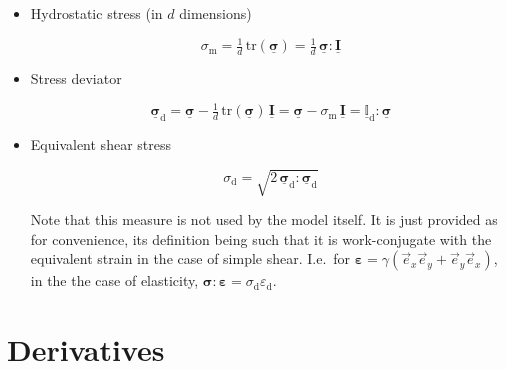 \documentclass[fleqn, colorlinks]{goose-article}
\newcommand\T[1]{\underline{\bm{{#1}}}}
\newcommand\TT[1]{\underline{\mathbb{{#1}}}}
\begin{document}
\begin{itemize}

    \item Hydrostatic stress (in $d$ dimensions)

    \begin{equation}
        \sigma_\mathrm{m}
        = \tfrac{1}{d} \, \mathrm{tr} ( \T{\sigma} )
        = \tfrac{1}{d} \, \T{\sigma} : \T{I}
    \end{equation}

    \item Stress deviator

    \begin{equation}
        \T{\sigma}_\mathrm{d}
        = \T{\sigma} - \tfrac{1}{d} \, \mathrm{tr} ( \T{\sigma} ) \, \T{I}
        = \T{\sigma} - \sigma_\mathrm{m} \, \T{I}
        = \TT{I}_\mathrm{d} : \T{\sigma}
    \end{equation}

    \item Equivalent shear stress

    \begin{equation}
        \sigma_\mathrm{d} = \sqrt{ 2 \, \T{\sigma}_\mathrm{d} : \T{\sigma}_\mathrm{d} }
    \end{equation}

    Note that this measure is not used by the model itself.
    It is just provided as for convenience, its definition being such that it is work-conjugate
    with the equivalent strain in the case of simple shear.
    I.e.\ for $\bm{\varepsilon} = \gamma (\vec{e}_x \vec{e}_y + \vec{e}_y \vec{e}_x)$,
    in the the case of elasticity,
    $\bm{\sigma} : \bm{\varepsilon} = \sigma_\mathrm{d} \varepsilon_\mathrm{d}$.

\end{itemize}

\section{Derivatives}
\label{sec:nomenclature:derivatives}
\end{document}
